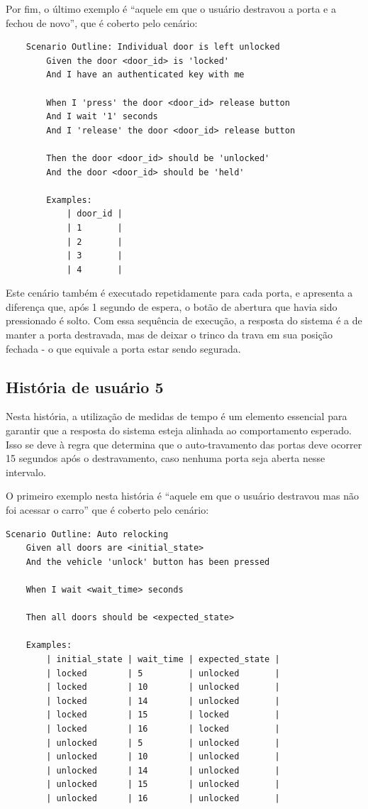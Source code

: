 Por fim, o último exemplo é ``aquele em que o usuário destravou a porta e a fechou de novo'', que é coberto pelo cenário:

\begin{verbatim}
    Scenario Outline: Individual door is left unlocked
        Given the door <door_id> is 'locked'
        And I have an authenticated key with me

        When I 'press' the door <door_id> release button
        And I wait '1' seconds
        And I 'release' the door <door_id> release button

        Then the door <door_id> should be 'unlocked'
        And the door <door_id> should be 'held'

        Examples:
            | door_id |
            | 1       |
            | 2       |
            | 3       |
            | 4       |
\end{verbatim}

Este cenário também é executado repetidamente para cada porta, e apresenta a diferença que, após 1 segundo de espera, o botão de abertura que havia sido pressionado 
é solto. Com essa sequência de execução, a resposta do sistema é a de manter a porta destravada, mas de deixar o trinco da trava em sua posição fechada - o que equivale 
a porta estar sendo segurada.


\subsection{História de usuário 5}

Nesta história, a utilização de medidas de tempo é um elemento essencial para garantir que a resposta do sistema esteja alinhada ao comportamento esperado. Isso 
se deve à regra que determina que o auto-travamento das portas deve ocorrer 15 segundos após o destravamento, caso nenhuma porta seja aberta nesse intervalo.

O primeiro exemplo nesta história é ``aquele em que o usuário destravou mas não foi acessar o carro'' que é coberto pelo cenário:

\begin{verbatim}
Scenario Outline: Auto relocking
    Given all doors are <initial_state>
    And the vehicle 'unlock' button has been pressed

    When I wait <wait_time> seconds

    Then all doors should be <expected_state>

    Examples:
        | initial_state | wait_time | expected_state |
        | locked        | 5         | unlocked       |
        | locked        | 10        | unlocked       |
        | locked        | 14        | unlocked       |
        | locked        | 15        | locked         |
        | locked        | 16        | locked         |
        | unlocked      | 5         | unlocked       |
        | unlocked      | 10        | unlocked       |
        | unlocked      | 14        | unlocked       |
        | unlocked      | 15        | unlocked       |
        | unlocked      | 16        | unlocked       |
\end{verbatim}

